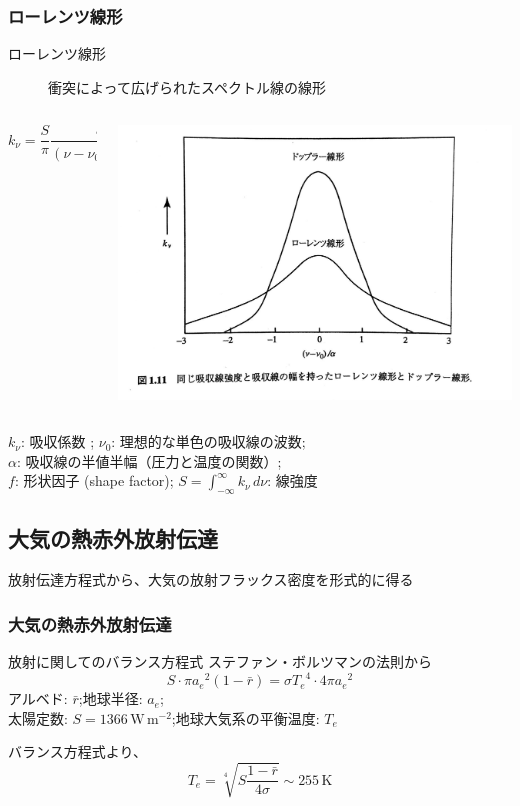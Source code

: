 \documentclass[unicode,colorlinks]{beamer}
\newcommand{\centeralign}[1]{\rule{0pt}{0pt}\hfill#1\hfill\rule{0pt}{0pt}}
\newcommand{\Unit}[1]{\,\mathrm{#1}}
\begin{document}
\begin{frame}
	\frametitle{ローレンツ線形}
	\begin{description}
		\item[ローレンツ線形] 衝突によって広げられたスペクトル線の線形
	\end{description}

	\begin{columns}
		\begin{column}{0.6\textwidth}
			\[k_\nu=\frac{S}{\pi}\frac{\alpha}{(\nu-\nu_0)^2+\alpha^2}=Sf[\nu-\nu_0]\]
		\end{column}
		\begin{column}{0.3\textwidth}
			\centeralign{\includegraphics[width=\textwidth]{lorentz.jpg}}
		\end{column}
	\end{columns}

	$k_\nu$: 吸収係数 ;\quad
	$\nu_0$: 理想的な単色の吸収線の波数;\\
	$\alpha$: 吸収線の半値半幅（圧力と温度の関数）;\\
	$f$: 形状因子 (shape factor);\quad
	$\displaystyle S=\int^\infty_{-\infty}k_\nu\,d\nu$: 線強度
\end{frame}

\begin{frame}
	\section{大気の熱赤外放射伝達}
	放射伝達方程式から、大気の放射フラックス密度を形式的に得る
\end{frame}

\begin{frame}
	\frametitle{大気の熱赤外放射伝達}
	\begin{block}{放射に関してのバランス方程式}
		ステファン・ボルツマンの法則から
		\[S\cdot\pi{a_e}^2(1-\bar r)=\sigma{T_e}^4\cdot4\pi{a_e}^2\]
		アルベド: $\bar r$;\quad 地球半径: $a_e$;\quad\\
		太陽定数: $S=1366\Unit{W\,m^{-2}}$;\quad 地球大気系の平衡温度: $T_e$

		バランス方程式より、
		\[T_e=\sqrt[4]{S\frac{1-\bar r}{4\sigma}}\sim255\Unit{K}\]
	\end{block}
\end{frame}
\end{document}
